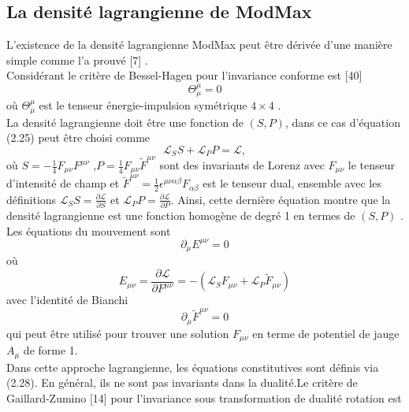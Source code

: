 \documentclass[12pt,a4paper, openany]{report}
\begin{document}
	\subsection{La densité lagrangienne de ModMax} 
	\par L'existence de la densité lagrangienne ModMax peut \^{e}tre dérivée d'une manière simple comme l'a prouvé [7] .\\
	Considérant le critère de Bessel-Hagen pour l'invariance conforme est [40]
	\begin{equation}
		\Theta_{\mu}^{\mu}=0
	\end{equation}
	où $\Theta_{\mu}^{\mu}$ est le tenseur énergie-impulsion  symétrique $4\times4$ .\\
	La densité lagrangienne doit \^{e}tre une fonction de $(S,P)$, dans ce cas d'équation (2.25) peut \^{e}tre choisi comme 
	\begin{equation}
		\mathcal{L}_S S+\mathcal{L}_P P =\mathcal{L} ,	
	\end{equation} 
	où  $S=-\frac{1}{4}F_{\mu \nu}F^{\mu \nu}$ ,$P=\frac{1}{4}F_{\mu \nu}\tilde{F}^{\mu \nu}$ sont des invariants de Lorenz avec $F_{\mu \nu}$ le tenseur d'intensité de champ et $\tilde{F}^{\mu \nu}=\frac{1}{2}\epsilon^{\mu \nu \alpha \beta}F_{\alpha \beta}$ est le tenseur dual, ensemble avec les définitions $\mathcal{L}_S S=\frac{\partial \mathcal{L}}{\partial S}$ et $\mathcal{L}_P P=\frac{\partial \mathcal{L}}{\partial P} $. Ainsi, cette dernière équation montre que la densité lagrangienne est une fonction homogène de degré 1 en termes de $(S,P)$ .\\
	Les équations du mouvement sont 
	\begin{equation}
		\partial_{\mu}E^{\mu \nu} =0
	\end{equation}
	où
	\begin{equation} 
		E_{\mu \nu}=\frac{\partial \mathcal{L}}{\partial{F}^{\mu \nu}}=-\left(\mathcal{L}_S F_{\mu \nu} +\mathcal{L}_P \tilde{F}_{\mu \nu}\right)
	\end{equation}
	avec l'identité de Bianchi 
	\begin{equation}
		\partial_{\mu}\tilde{F}^{\mu \nu} =0
	\end{equation}
	qui peut \^{e}tre utilisé pour trouver une solution $ F_{\mu \nu} $ en terme de potentiel de jauge $A_{\mu}$ de forme 1.\\
	Dans cette approche lagrangienne, les équations constitutives sont définis via (2.28). En général, ils ne sont pas invariants dans la dualité.Le critère de Gaillard-Zumino [14] pour l'invariance sous transformation de dualité rotation est 
\end{document}

